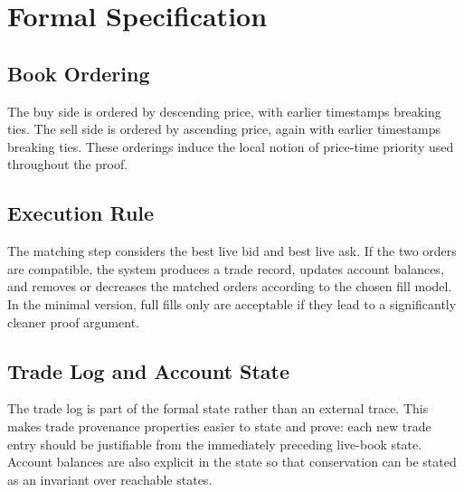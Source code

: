 \section{Formal Specification}

\subsection{Book Ordering}

The buy side is ordered by descending price, with earlier timestamps breaking
ties. The sell side is ordered by ascending price, again with earlier
timestamps breaking ties. These orderings induce the local notion of
price-time priority used throughout the proof.

\subsection{Execution Rule}

The matching step considers the best live bid and best live ask. If the two
orders are compatible, the system produces a trade record, updates account
balances, and removes or decreases the matched orders according to the chosen
fill model. In the minimal version, full fills only are acceptable if they
lead to a significantly cleaner proof argument.

\subsection{Trade Log and Account State}

The trade log is part of the formal state rather than an external trace. This
makes trade provenance properties easier to state and prove: each new trade
entry should be justifiable from the immediately preceding live-book state.
Account balances are also explicit in the state so that conservation can be
stated as an invariant over reachable states.

